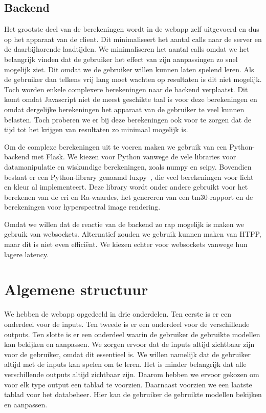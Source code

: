 \subsection{Backend}

Het grootste deel van de berekeningen wordt in de webapp zelf uitgevoerd en dus op het apparaat van de client. Dit minimaliseert het aantal calls naar de server en de daarbijhorende laadtijden. We minimaliseren het aantal calls omdat we het belangrijk vinden dat de gebruiker het effect van zijn aanpassingen zo snel mogelijk ziet. Dit omdat we de gebruiker willen kunnen laten spelend leren. Als de gebruiker dan telkens vrij lang moet wachten op resultaten is dit niet mogelijk. Toch worden enkele complexere berekeningen naar de backend verplaatst. Dit komt omdat Javascript niet de meest geschikte taal is voor deze berekeningen en omdat dergelijke berekeningen het apparaat van de gebruiker te veel kunnen belasten. Toch proberen we er bij deze berekeningen ook voor te zorgen dat de tijd tot het krijgen van resultaten zo minimaal mogelijk is.

Om de complexe berekeningen uit te voeren maken we gebruik van een Python-backend met Flask. We kiezen voor Python vanwege de vele libraries voor datamanipulatie en wiskundige berekeningen, zoals numpy en scipy. Bovendien bestaat er een Python-library genaamd luxpy~\cite{smetTutorialLuxPyPython2020}, die veel berekeningen voor licht en kleur al implementeert. Deze library wordt onder andere gebruikt voor het berekenen van de \gls{cri} en Ra-waardes, het genereren van een tm30-rapport en de berekeningen voor hyperspectral image rendering.

Omdat we willen dat de reactie van de backend zo rap mogelijk is maken we gebruik van websockets. Alternatief zouden we gebruik kunnen maken van HTPP, maar dit is niet even effici\"ent. We kiezen echter voor websockets vanwege hun lagere latency.

\section{Algemene structuur}

We hebben de webapp opgedeeld in drie onderdelen. Ten eerste is er een onderdeel voor de inputs. Ten tweede is er een onderdeel voor de verschillende outputs. Ten slotte is er een onderdeel waarin de gebruiker de gebruikte modellen kan bekijken en aanpassen. We zorgen ervoor dat de inputs altijd zichtbaar zijn voor de gebruiker, omdat dit essentieel is. We willen namelijk dat de gebruiker altijd met de inputs kan spelen om te leren. Het is minder belangrijk dat alle verschillende outputs altijd zichtbaar zijn. Daarom hebben we ervoor gekozen om voor elk type output een tablad te voorzien. Daarnaast voorzien we een laatste tablad voor het databeheer. Hier kan de gebruiker de gebruikte modellen bekijken en aanpassen.

